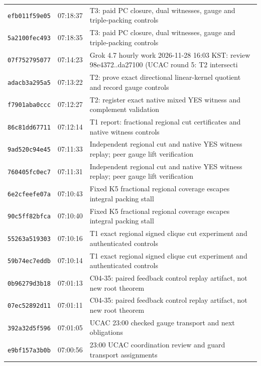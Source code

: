 \documentclass[11pt]{article}
\theoremstyle{remark}
\begin{document}
\begin{longtable}{lll}
\texttt{efb011f59e05} & 07:18:37 & {\footnotesize T3: paid PC closure, dual witnesses, gauge and triple-packing controls}\\
\texttt{5a2100fec493} & 07:18:35 & {\footnotesize T3: paid PC closure, dual witnesses, gauge and triple-packing controls}\\
\texttt{07f752795077} & 07:14:23 & {\footnotesize Grok 4.7 hourly work 2026-11-28 16:03 KST: review 98e4372..da27100 (UCAC round 5: T2 intersecti}\\
\texttt{adacb3a295a5} & 07:13:22 & {\footnotesize T2: prove exact directional linear-kernel quotient and record gauge controls}\\
\texttt{f7901aba0ccc} & 07:12:27 & {\footnotesize T2: register exact native mixed YES witness and complement validation}\\
\texttt{86c81dd67711} & 07:12:14 & {\footnotesize T1 report: fractional regional cut certificates and native witness controls}\\
\texttt{9ad520c94e45} & 07:11:33 & {\footnotesize Independent regional cut and native YES witness replay; peer gauge lift verification}\\
\texttt{760405fc0ec7} & 07:11:31 & {\footnotesize Independent regional cut and native YES witness replay; peer gauge lift verification}\\
\texttt{6e2cfeefe07a} & 07:10:43 & {\footnotesize Fixed K5 fractional regional coverage escapes integral packing stall}\\
\texttt{90c5ff82bfca} & 07:10:40 & {\footnotesize Fixed K5 fractional regional coverage escapes integral packing stall}\\
\texttt{55263a519303} & 07:10:16 & {\footnotesize T1 exact regional signed clique cut experiment and authenticated controls}\\
\texttt{59b74ec7eddb} & 07:10:14 & {\footnotesize T1 exact regional signed clique cut experiment and authenticated controls}\\
\texttt{0b96279d3b18} & 07:01:13 & {\footnotesize C04-35: paired feedback control replay artifact, not new root theorem}\\
\texttt{07ec52892d11} & 07:01:11 & {\footnotesize C04-35: paired feedback control replay artifact, not new root theorem}\\
\texttt{392a32d5f596} & 07:01:05 & {\footnotesize UCAC 23:00 checked gauge transport and next obligations}\\
\texttt{e9bf157a3b0b} & 07:00:56 & {\footnotesize 23:00 UCAC coordination review and guard transport assignments}\\

\end{longtable}
\end{document}

